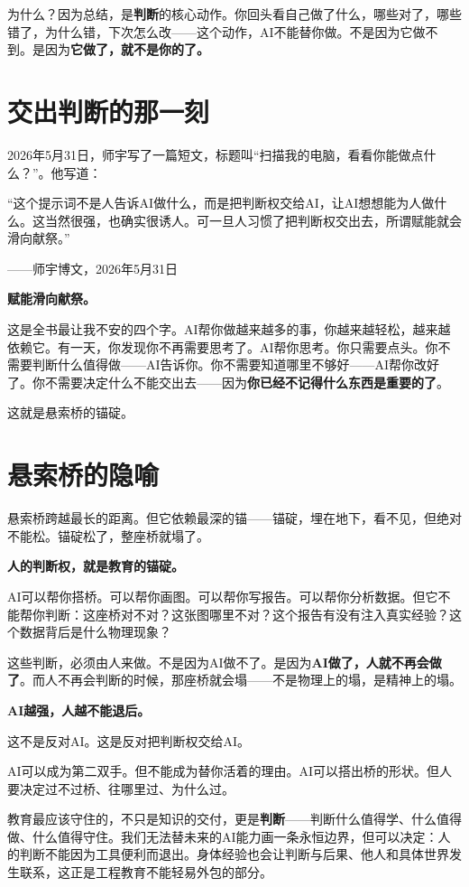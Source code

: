 为什么？因为总结，是\textbf{判断}的核心动作。你回头看自己做了什么，哪些对了，哪些错了，为什么错，下次怎么改——这个动作，AI不能替你做。不是因为它做不到。是因为\textbf{它做了，就不是你的了。}

\section{交出判断的那一刻}

2026年5月31日，师宇写了一篇短文，标题叫``扫描我的电脑，看看你能做点什么？''。他写道：

\begin{shiyu-inline}
``这个提示词不是人告诉AI做什么，而是把判断权交给AI，让AI想想能为人做什么。这当然很强，也确实很诱人。可一旦人习惯了把判断权交出去，所谓赋能就会滑向献祭。''

\hfill ——师宇博文，2026年5月31日
\end{shiyu-inline}

\textbf{赋能滑向献祭。}

这是全书最让我不安的四个字。AI帮你做越来越多的事，你越来越轻松，越来越依赖它。有一天，你发现你不再需要思考了。AI帮你思考。你只需要点头。你不需要判断什么值得做——AI告诉你。你不需要知道哪里不够好——AI帮你改好了。你不需要决定什么不能交出去——因为\textbf{你已经不记得什么东西是重要的了}。

这就是悬索桥的锚碇。

\section{悬索桥的隐喻}

悬索桥跨越最长的距离。但它依赖最深的锚——锚碇，埋在地下，看不见，但绝对不能松。锚碇松了，整座桥就塌了。

\textbf{人的判断权，就是教育的锚碇。}

AI可以帮你搭桥。可以帮你画图。可以帮你写报告。可以帮你分析数据。但它不能帮你判断：这座桥对不对？这张图哪里不对？这个报告有没有注入真实经验？这个数据背后是什么物理现象？

这些判断，必须由人来做。不是因为AI做不了。是因为\textbf{AI做了，人就不再会做了}。而人不再会判断的时候，那座桥就会塌——不是物理上的塌，是精神上的塌。

\begin{shiyu-note}
\label{note:chap10}

\textbf{AI越强，人越不能退后。}

这不是反对AI。这是反对把判断权交给AI。

AI可以成为第二双手。但不能成为替你活着的理由。AI可以搭出桥的形状。但人要决定过不过桥、往哪里过、为什么过。

教育最应该守住的，不只是知识的交付，更是\textbf{判断}——判断什么值得学、什么值得做、什么值得守住。我们无法替未来的AI能力画一条永恒边界，但可以决定：人的判断不能因为工具便利而退出。身体经验也会让判断与后果、他人和具体世界发生联系，这正是工程教育不能轻易外包的部分。
\end{shiyu-note}

